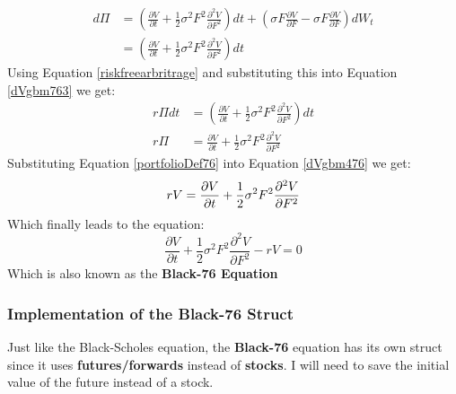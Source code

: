 \documentclass[12pt]{article}
\numberwithin{equation}{section}
\begin{document}
\begin{equation}
	\begin{aligned}
		d\Pi &= (\frac{\partial V}{\partial t} +
		\frac{1}{2}\sigma^2F^2\frac{\partial^2 V}{\partial F^2} ) dt + (\sigma F \frac{\partial V}{\partial F} -\sigma F \frac{\partial V}{\partial F} ) dW_t \\
		&=  (\frac{\partial V}{\partial t} +
		\frac{1}{2}\sigma^2F^2\frac{\partial^2 V}{\partial F^2} ) dt
	\end{aligned}
	\label{dVgbm763}
\end{equation}
Using Equation \ref{riskfreearbritrage} and substituting this into Equation \ref{dVgbm763} we get:
\begin{equation}
	\begin{aligned}
		r\Pi dt &= (\frac{\partial V}{\partial t} +
		\frac{1}{2}\sigma^2F^2\frac{\partial^2 V}{\partial F^2} ) dt \\
		r\Pi &= \frac{\partial V}{\partial t} +
		\frac{1}{2}\sigma^2F^2\frac{\partial^2 V}{\partial F^2} 
	\end{aligned}
	\label{dVgbm476}
\end{equation}
Substituting Equation \ref{portfolioDef76} into Equation \ref{dVgbm476} we get:
\begin{equation}
		rV = \frac{\partial V}{\partial t} +
		\frac{1}{2}\sigma^2F^2\frac{\partial^2 V}{\partial F^2}  \\ 
\end{equation}
Which finally leads to the equation:
\begin{equation}
	\boxed{ \frac{\partial V}{\partial t} +
	\frac{1}{2}\sigma^2F^2\frac{\partial^2 V}{\partial F^2}  - rV = 0 }
\end{equation}
Which is also known as the \textbf{Black-76 Equation}

\newpage
\subsubsection{Implementation of the Black-76 Struct}
Just like the Black-Scholes equation, the \textbf{Black-76} equation has its own struct since it uses \textbf{futures/forwards} instead of \textbf{stocks}. I will need to save the initial value of the future instead of a stock. 
\end{document}
